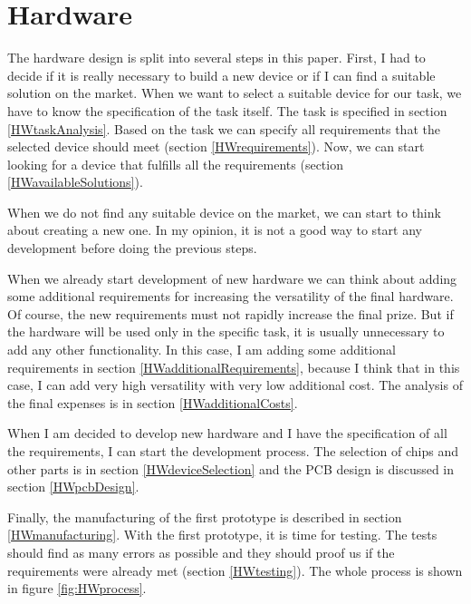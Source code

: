 \chapter{Hardware}
The hardware design is split into several steps in this paper. First, I had to decide if it is really necessary to build a new device or if I can find a suitable solution on the market. When we want to select a suitable device for our task, we have to know the specification of the task itself. The task is specified in section \ref{HWtaskAnalysis}. Based on the task we can specify all requirements that the selected device should meet (section \ref{HWrequirements}). Now, we can start looking for a device that fulfills all the requirements (section \ref{HWavailableSolutions}).

When we do not find any suitable device on the market, we can start to think about creating a new one. In my opinion, it is not a good way to start any development before doing the previous steps.

When we already start development of new hardware we can think about adding some additional requirements for increasing the versatility of the final hardware. Of course, the new requirements must not rapidly increase the final prize. But if the hardware will be used only in the specific task, it is usually unnecessary to add any other functionality. In this case, I am adding some additional requirements in section \ref{HWadditionalRequirements}, because I think that in this case, I can add very high versatility with very low additional cost. The analysis of the final expenses is in section \ref{HWadditionalCosts}.

When I am decided to develop new hardware and I have the specification of all the requirements, I can start the development process. The selection of chips and other parts is in section \ref{HWdeviceSelection} and the \ac{PCB} design is discussed in section \ref{HWpcbDesign}.

Finally, the manufacturing of the first prototype is described in section \ref{HWmanufacturing}. With the first prototype, it is time for testing. The tests should find as many errors as possible and they should proof us if the requirements were already met (section \ref{HWtesting}). The whole process is shown in figure \ref{fig:HWprocess}.

